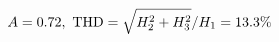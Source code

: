 \documentclass[preview]{standalone}
\begin{document}
\begin{align*}
\special{dvisvgm:raw <g id='unique000'>}A=0.72,\ \text{THD}=\sqrt{H_2^2+H_3^2}/H_1=13.3\%\special{dvisvgm:raw </g>}
\end{align*}
\end{document}
